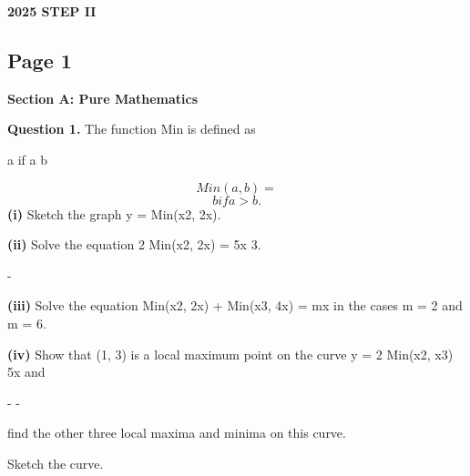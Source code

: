 \documentclass[12pt]{article}
\begin{document}
\begin{center}
{\Large \textbf{2025 STEP II}}
\end{center}

\subsection*{Page 1}
\begin{flushleft}
\bigskip\textbf{Section A: Pure Mathematics}\par
\bigskip\textbf{Question 1.} The function Min is defined as\par
a if a  b\par
\[Min(a, b) =\]
\[b if a > b .\]
\textbf{(i)} Sketch the graph y = Min(x2, 2x).\par
\textbf{(ii)} Solve the equation 2 Min(x2, 2x) = 5x 3.\par
-\par
\textbf{(iii)} Solve the equation Min(x2, 2x) + Min(x3, 4x) = mx in the cases m = 2 and m = 6.\par
\textbf{(iv)} Show that (1, 3) is a local maximum point on the curve y = 2 Min(x2, x3) 5x and\par
- -\par
find the other three local maxima and minima on this curve.\par
Sketch the curve.\par
\end{flushleft}
\end{document}

